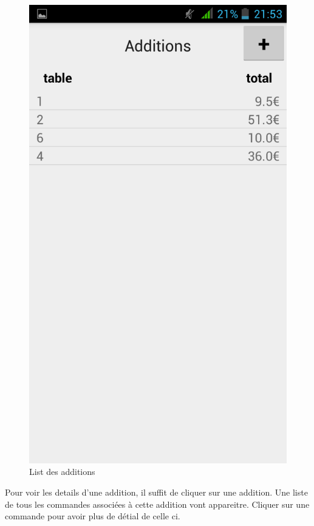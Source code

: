 \begin{figure}[H]
	\centering
	\includegraphics[scale=0.15]{img/bills-list.png}
	\caption{List des additions}
	\label{fig:bills}
\end{figure}

Pour voir les details d'une addition, il suffit de cliquer sur une addition. Une liste de tous les commandes associées à cette addition vont appareitre. Cliquer sur une commande pour avoir plus de détial de celle ci.


